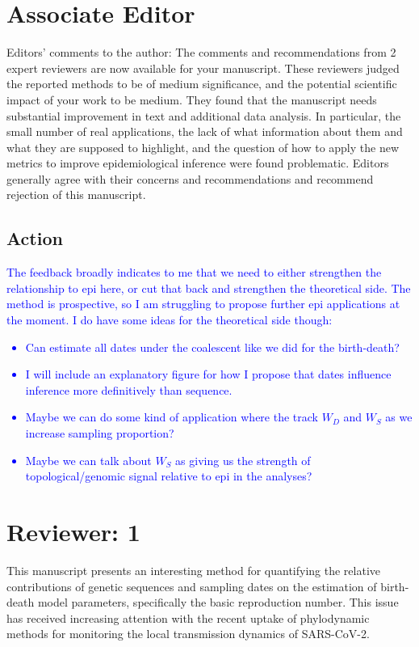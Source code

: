\documentclass{article}
\begin{document}
\section*{Associate Editor}
Editors’ comments to the author:
The comments and recommendations from 2 expert reviewers are now available for your manuscript. These reviewers judged the reported methods to be of medium significance, and the potential scientific impact of your work to be medium. They found that the manuscript needs substantial improvement in text and additional data analysis. In particular, the small number of real applications, the lack of what information about them and what they are supposed to highlight, and the question of how to apply the new metrics to improve epidemiological inference were found problematic. Editors generally agree with their concerns and recommendations and recommend rejection of this manuscript.

\subsection*{Action}
\textcolor{blue}{
The feedback broadly indicates to me that we need to either strengthen the relationship to epi here, or cut that back and strengthen the theoretical side. The method is prospective, so I am struggling to propose further epi applications at the moment. I do have some ideas for the theoretical side though:
\begin{itemize}
    \item Can estimate all dates under the coalescent like we did for the birth-death?
    \item I will include an explanatory figure for how I propose that dates influence inference more definitively than sequence.
    \item Maybe we can do some kind of application where the track $W_D$ and $W_S$ as we increase sampling proportion?
    \item Maybe we can talk about $W_S$ as giving us the strength of topological/genomic signal relative to epi in the analyses?
\end{itemize}}

\section*{Reviewer: 1}

This manuscript presents an interesting method for quantifying the relative contributions of genetic sequences and sampling dates on the estimation of birth-death model parameters, specifically the basic reproduction number.  This issue has received increasing attention with the recent uptake of phylodynamic methods for monitoring the local transmission dynamics of SARS-CoV-2.  
\end{document}
